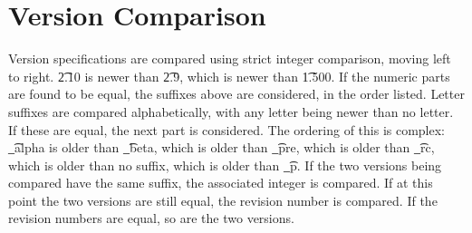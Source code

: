 \section{Version Comparison}
Version specifications are compared using strict integer comparison, moving left to right. \t{2.10}
is newer than \t{2.9}, which is newer than \t{1.500}. If the numeric parts are found to be equal, the
suffixes above are considered, in the order listed. Letter suffixes are compared alphabetically,
with any letter being newer than no letter. If these are equal, the next part is considered. The
ordering of this is complex: \t{\_alpha} is older than \t{\_beta}, which is older than \t{\_pre},
which is older than \t{\_rc}, which is older than no suffix, which is older than \t{\_p}. If the two
versions being compared have the same suffix, the associated integer is compared. If at this point
the two versions are still equal, the revision number is compared. If the revision numbers are
equal, so are the two versions.

